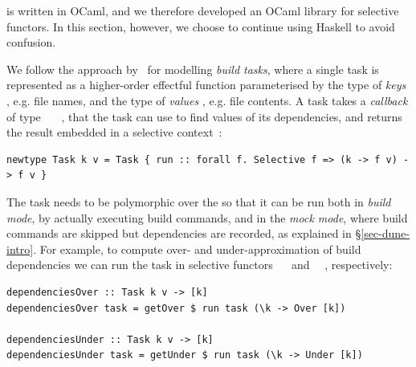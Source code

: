 \Dune is written in OCaml, and we therefore developed an OCaml library for
selective functors. In this section, however, we choose to continue using
Haskell to avoid confusion.

We follow the approach by~\citet{mokhov2018build} for modelling \emph{build
tasks}, where a single task is represented as a higher-order effectful function
parameterised by the type of \emph{keys} , e.g. file names, and the type
of \emph{values} , e.g. file contents. A task takes a \emph{callback} of
type ~\hs{->}~~, that the task can use to find values of its
dependencies, and returns the result embedded in a selective context~:

\vspace{1mm}
\begin{verbatim}
newtype Task k v = Task { run :: forall f. Selective f => (k -> f v) -> f v }
\end{verbatim}
\vspace{1mm}

\noindent
The task needs to be polymorphic over the  so that it can be run both in
\emph{build mode}, by actually executing build commands, and in the \emph{mock
mode}, where build commands are skipped but dependencies are recorded, as
explained in \S\ref{sec-dune-intro}. For example, to compute over- and
under-approximation of build dependencies we can run the task in selective
functors ~\hs{=}~ and ~\hs{=}~, respectively:

\vspace{1mm}
\begin{verbatim}
dependenciesOver :: Task k v -> [k]
dependenciesOver task = getOver $ run task (\k -> Over [k])

dependenciesUnder :: Task k v -> [k]
dependenciesUnder task = getUnder $ run task (\k -> Under [k])
\end{verbatim}
\vspace{1mm}

